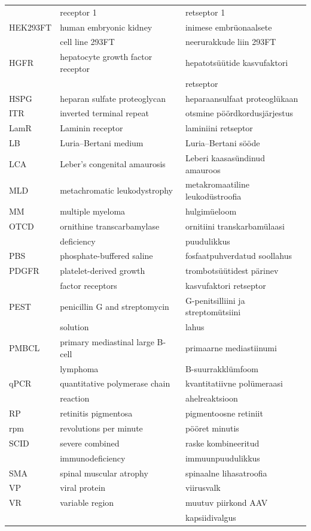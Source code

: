 \documentclass{trkut}%
\begin{document}
\begin{center}
\begin{longtable}{p{2.5cm} p{7.3cm} p{6cm}}
		& receptor 1 & retseptor 1 \\
		HEK293FT & human embryonic kidney & inimese embrüonaalsete \\ 
		& cell line 293FT & neerurakkude liin 293FT \\
		HGFR & hepatocyte growth factor receptor & hepatotsüütide kasvufaktori \\
		& & retseptor \\
		HSPG & heparan sulfate proteoglycan & heparaansulfaat proteoglükaan \\
		ITR & inverted terminal repeat & otsmine pöördkordusjärjestus \\
		LamR & Laminin receptor & laminiini retseptor \\
		LB & Luria–Bertani medium & Luria–Bertani sööde \\
		LCA & Leber’s congenital amaurosis & Leberi kaasasündinud amauroos \\
		MLD & metachromatic leukodystrophy & 
		metakromaatiline leukodüstroofia \\
		MM & multiple myeloma & hulgimüeloom \\
		OTCD & ornithine transcarbamylase & ornitiini transkarbamülaasi \\
		& deficiency & puudulikkus \\
		PBS & phosphate-buffered saline & fosfaatpuhverdatud soollahus \\
		PDGFR & platelet-derived growth & trombotsüütidest pärinev \\
		& factor receptors & kasvufaktori retseptor \\
		PEST & penicillin G and streptomycin & G-penitsilliini ja streptomütsiini \\
		& solution & lahus \\		
		PMBCL & primary mediastinal large B-cell & primaarne mediastiinumi \\
		& lymphoma & B-suurrakklümfoom \\
		qPCR & quantitative polymerase chain & kvantitatiivne polümeraasi \\
		& reaction & ahelreaktsioon \\
		RP & retinitis pigmentosa & pigmentoosne retiniit \\
		rpm & revolutions per minute & pööret minutis \\
		SCID & severe combined & raske kombineeritud \\
		& immunodeficiency & immuunpuudulikkus \\
		SMA & spinal muscular atrophy & spinaalne lihasatroofia \\
		VP & viral protein & viirusvalk \\
		VR & variable region & muutuv piirkond AAV \\
		& & kapsiidivalgus \\
		
	\end{longtable}
\end{center}
\end{document}
